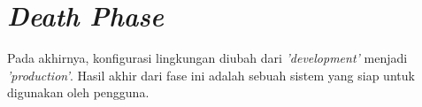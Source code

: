 \section{\textit{Death Phase}}

Pada akhirnya, konfigurasi lingkungan diubah dari \textit{'development'} menjadi \textit{'production'}. Hasil akhir dari fase ini adalah sebuah sistem yang siap untuk digunakan oleh pengguna.














